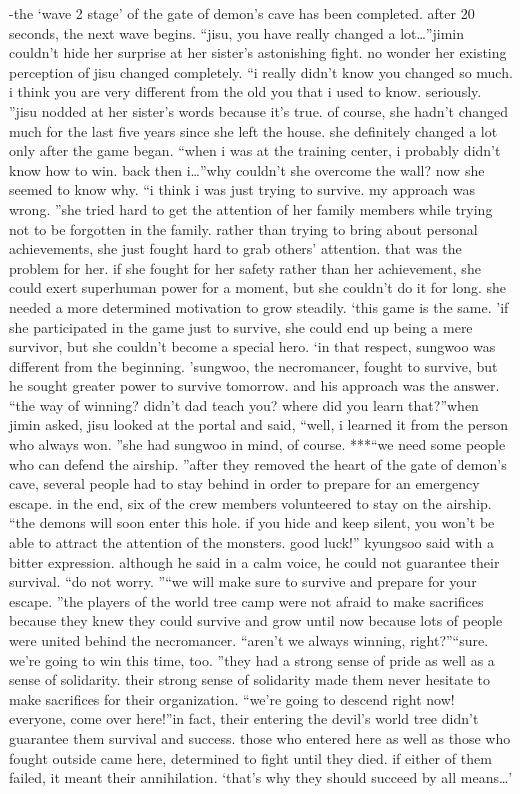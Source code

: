 -the ‘wave 2 stage’ of the gate of demon’s cave has been completed.
 after 20 seconds, the next wave begins.
“jisu, you have really changed a lot…”jimin couldn’t hide her surprise at her sister’s astonishing fight.
 no wonder her existing perception of jisu changed completely.
“i really didn’t know you changed so much.
 i think you are very different from the old you that i used to know.
 seriously.
”jisu nodded at her sister’s words because it’s true.
 of course, she hadn’t changed much for the last five years since she left the house.
 she definitely changed a lot only after the game began.
“when i was at the training center, i probably didn’t know how to win.
 back then i…”why couldn’t she overcome the wall? now she seemed to know why.
“i think i was just trying to survive.
 my approach was wrong.
”she tried hard to get the attention of her family members while trying not to be forgotten in the family.
 rather than trying to bring about personal achievements, she just fought hard to grab others’ attention.
 that was the problem for her.
if she fought for her safety rather than her achievement, she could exert superhuman power for a moment, but she couldn’t do it for long.
 she needed a more determined motivation to grow steadily.
‘this game is the same.
’if she participated in the game just to survive, she could end up being a mere survivor, but she couldn’t become a special hero.
‘in that respect, sungwoo was different from the beginning.
’sungwoo, the necromancer, fought to survive, but he sought greater power to survive tomorrow.
 and his approach was the answer.
“the way of winning? didn’t dad teach you? where did you learn that?”when jimin asked, jisu looked at the portal and said, “well, i learned it from the person who always won.
”she had sungwoo in mind, of course.
***“we need some people who can defend the airship.
”after they removed the heart of the gate of demon’s cave, several people had to stay behind in order to prepare for an emergency escape.
 in the end, six of the crew members volunteered to stay on the airship.
“the demons will soon enter this hole.
 if you hide and keep silent, you won’t be able to attract the attention of the monsters.
 good luck!” kyungsoo said with a bitter expression.
although he said in a calm voice, he could not guarantee their survival.
“do not worry.
”“we will make sure to survive and prepare for your escape.
”the players of the world tree camp were not afraid to make sacrifices because they knew they could survive and grow until now because lots of people were united behind the necromancer.
“aren’t we always winning, right?”“sure.
 we’re going to win this time, too.
”they had a strong sense of pride as well as a sense of solidarity.
 their strong sense of solidarity made them never hesitate to make sacrifices for their organization.
“we’re going to descend right now! everyone, come over here!”in fact, their entering the devil’s world tree didn’t guarantee them survival and success.
those who entered here as well as those who fought outside came here, determined to fight until they died.
 if either of them failed, it meant their annihilation.
‘that’s why they should succeed by all means…’


